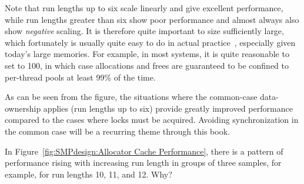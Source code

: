 Note that run lengths up to six scale linearly and give excellent performance,
while run lengths greater than six show poor performance and almost always
also show \emph{negative} scaling.
It is therefore quite important to size 
sufficiently large,
which fortunately is usually quite easy to do in actual
practice~\cite{McKenney01e}, especially given today's large memories.
For example, in most systems, it is quite reasonable to set
 to 100, in which case allocations and frees
are guaranteed to be confined to per-thread pools at least 99\% of
the time.

As can be seen from the figure, the situations where the common-case
data-ownership applies (run lengths up to six) provide greatly improved
performance compared to the cases where locks must be acquired.
Avoiding synchronization in the common case will be a recurring theme through
this book.

\QuickQuiz{}
	In Figure~\ref{fig:SMPdesign:Allocator Cache Performance},
	there is a pattern of performance rising with increasing run
	length in groups of three samples, for example, for run lengths
	10, 11, and 12.
	Why?
 \QuickQuizEnd


